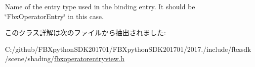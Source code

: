 Name of the entry type used in the binding entry. It should be \char`\"{}\+Fbx\+Operator\+Entry\char`\"{} in this case. 

このクラス詳解は次のファイルから抽出されました\+:\begin{DoxyCompactItemize}
\item 
C\+:/github/\+F\+B\+Xpython\+S\+D\+K201701/\+F\+B\+Xpython\+S\+D\+K201701/2017./include/fbxsdk/scene/shading/\hyperlink{fbxoperatorentryview_8h}{fbxoperatorentryview.\+h}\end{DoxyCompactItemize}
